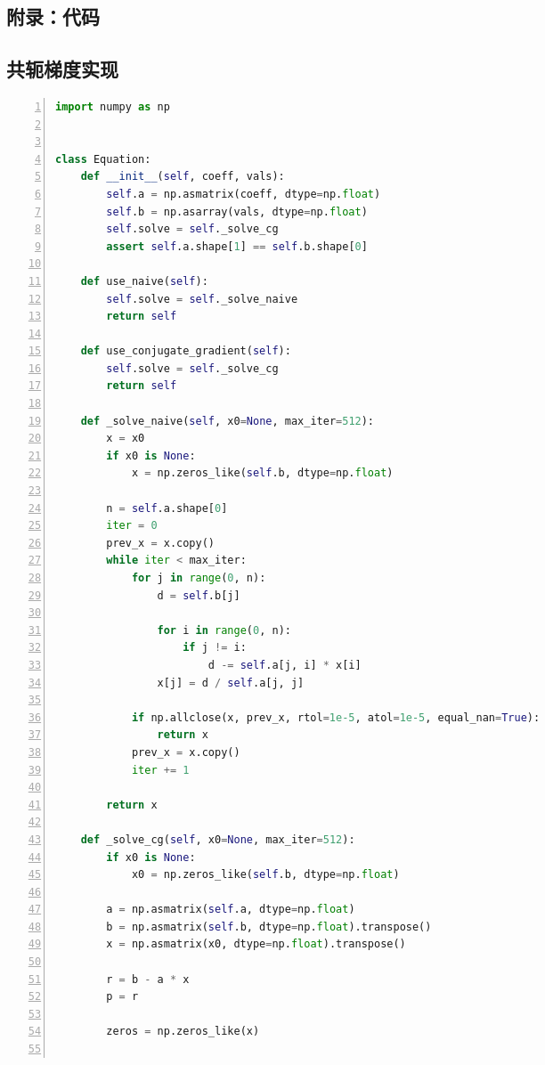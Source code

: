 \documentclass[a4paper,twoside]{article}
\begin{document}
\begin{spacing}{1.2}
\clearpage

\appendix

\section{附录：代码}
\label{sec:app_code}

\subsection{共轭梯度实现}
\begin{lstlisting}[language=Python,numbers=left,style=PythonStyle,label={code:cg},caption=共轭梯度实现]
import numpy as np


class Equation:
    def __init__(self, coeff, vals):
        self.a = np.asmatrix(coeff, dtype=np.float)
        self.b = np.asarray(vals, dtype=np.float)
        self.solve = self._solve_cg
        assert self.a.shape[1] == self.b.shape[0]

    def use_naive(self):
        self.solve = self._solve_naive
        return self

    def use_conjugate_gradient(self):
        self.solve = self._solve_cg
        return self

    def _solve_naive(self, x0=None, max_iter=512):
        x = x0
        if x0 is None:
            x = np.zeros_like(self.b, dtype=np.float)

        n = self.a.shape[0]
        iter = 0
        prev_x = x.copy()
        while iter < max_iter:
            for j in range(0, n):
                d = self.b[j]

                for i in range(0, n):
                    if j != i:
                        d -= self.a[j, i] * x[i]
                x[j] = d / self.a[j, j]

            if np.allclose(x, prev_x, rtol=1e-5, atol=1e-5, equal_nan=True):
                return x
            prev_x = x.copy()
            iter += 1

        return x

    def _solve_cg(self, x0=None, max_iter=512):
        if x0 is None:
            x0 = np.zeros_like(self.b, dtype=np.float)

        a = np.asmatrix(self.a, dtype=np.float)
        b = np.asmatrix(self.b, dtype=np.float).transpose()
        x = np.asmatrix(x0, dtype=np.float).transpose()

        r = b - a * x
        p = r

        zeros = np.zeros_like(x)


\end{lstlisting}
\end{spacing}
\end{document}
